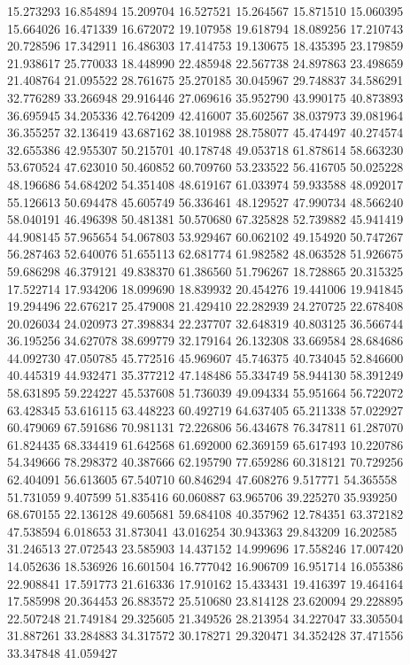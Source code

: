 15.273293
16.854894
15.209704
16.527521
15.264567
15.871510
15.060395
15.664026
16.471339
16.672072
19.107958
19.618794
18.089256
17.210743
20.728596
17.342911
16.486303
17.414753
19.130675
18.435395
23.179859
21.938617
25.770033
18.448990
22.485948
22.567738
24.897863
23.498659
21.408764
21.095522
28.761675
25.270185
30.045967
29.748837
34.586291
32.776289
33.266948
29.916446
27.069616
35.952790
43.990175
40.873893
36.695945
34.205336
42.764209
42.416007
35.602567
38.037973
39.081964
36.355257
32.136419
43.687162
38.101988
28.758077
45.474497
40.274574
32.655386
42.955307
50.215701
40.178748
49.053718
61.878614
58.663230
53.670524
47.623010
50.460852
60.709760
53.233522
56.416705
50.025228
48.196686
54.684202
54.351408
48.619167
61.033974
59.933588
48.092017
55.126613
50.694478
45.605749
56.336461
48.129527
47.990734
48.566240
58.040191
46.496398
50.481381
50.570680
67.325828
52.739882
45.941419
44.908145
57.965654
54.067803
53.929467
60.062102
49.154920
50.747267
56.287463
52.640076
51.655113
62.681774
61.982582
48.063528
51.926675
59.686298
46.379121
49.838370
61.386560
51.796267
18.728865
20.315325
17.522714
17.934206
18.099690
18.839932
20.454276
19.441006
19.941845
19.294496
22.676217
25.479008
21.429410
22.282939
24.270725
22.678408
20.026034
24.020973
27.398834
22.237707
32.648319
40.803125
36.566744
36.195256
34.627078
38.699779
32.179164
26.132308
33.669584
28.684686
44.092730
47.050785
45.772516
45.969607
45.746375
40.734045
52.846600
40.445319
44.932471
35.377212
47.148486
55.334749
58.944130
58.391249
58.631895
59.224227
45.537608
51.736039
49.094334
55.951664
56.722072
63.428345
53.616115
63.448223
60.492719
64.637405
65.211338
57.022927
60.479069
67.591686
70.981131
72.226806
56.434678
76.347811
61.287070
61.824435
68.334419
61.642568
61.692000
62.369159
65.617493
10.220786
54.349666
78.298372
40.387666
62.195790
77.659286
60.318121
70.729256
62.404091
56.613605
67.540710
60.846294
47.608276
9.517771
54.365558
51.731059
9.407599
51.835416
60.060887
63.965706
39.225270
35.939250
68.670155
22.136128
49.605681
59.684108
40.357962
12.784351
63.372182
47.538594
6.018653
31.873041
43.016254
30.943363
29.843209
16.202585
31.246513
27.072543
23.585903
14.437152
14.999696
17.558246
17.007420
14.052636
18.536926
16.601504
16.777042
16.906709
16.951714
16.055386
22.908841
17.591773
21.616336
17.910162
15.433431
19.416397
19.464164
17.585998
20.364453
26.883572
25.510680
23.814128
23.620094
29.228895
22.507248
21.749184
29.325605
21.349526
28.213954
34.227047
33.305504
31.887261
33.284883
34.317572
30.178271
29.320471
34.352428
37.471556
33.347848
41.059427
